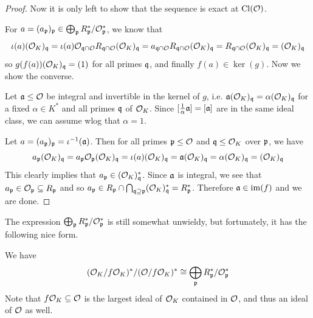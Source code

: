\begin{proof}
    Now it is only left to show that the sequence is exact at $\Cl(\O)$.

    For $a = (a_\p)_\p \in \bigoplus_\p R_\p^*/\O_\p^*$, we know that
    \begin{equation*}
        \iota(a)(\O_K)_\q = \iota(a) \O_{\q \cap \O} R_{\q \cap \O} (\O_K)_\q = a_{\q \cap \O} R_{\q \cap \O} (\O_K)_\q = R_{\q \cap \O} (\O_K)_\q = (\O_K)_\q
    \end{equation*}
    so $g(f(a))(\O_K)_\q = (1)$ for all primes $\q$, and finally $f(a) \in \ker(g)$.
    Now we show the converse.

    Let $\a \leq \O$ be integral and invertible in the kernel of $g$, i.e. $\a(\O_K)_\q = \alpha(\O_K)_\q$ for a fixed $\alpha \in K^*$ and all primes $\q$ of $\O_K$.
    Since $[\frac 1 \alpha \a] = [\a]$ are in the same ideal class, we can assume wlog that $\alpha = 1$.

    Let $a = (a_\p)_\p = \iota^{-1}(\a)$.
    Then for all primes $\p \leq \O$ and $\q \leq \O_K$ over $\p$, we have
    \begin{equation*}
        a_\p (\O_K)_\q = a_\p \O_\p (\O_K)_\q = \iota(a) (\O_K)_\q = \a (\O_K)_\q = \alpha (\O_K)_\q = (\O_K)_\q
    \end{equation*}
    This clearly implies that $a_\p \in (\O_K)_\q^*$.
    Since $\a$ is integral, we see that $a_\p \in \O_\p \subseteq R_\p$ and so $a_\p \in R_\p \cap \bigcap_{\q \supseteq \p} (\O_K)_\q^* = R_\p^*$.
    Therefore $\a \in \mathrm{im}(f)$ and we are done.
\end{proof}
The expression $\bigoplus_\p R_\p^*/\O_\p^*$ is still somewhat unwieldy, but fortunately, it has the following nice form.
\begin{lemma}
    We have
    \begin{equation*}
        (\O_K/f\O_K)^*/(\O/f\O_K)^* \cong \bigoplus_\p R_\p^*/\O_\p^*
    \end{equation*}
    Note that $f\O_K \subseteq \O$ is the largest ideal of $\O_K$ contained in $\O$, and thus an ideal of $\O$ as well.
\end{lemma}
